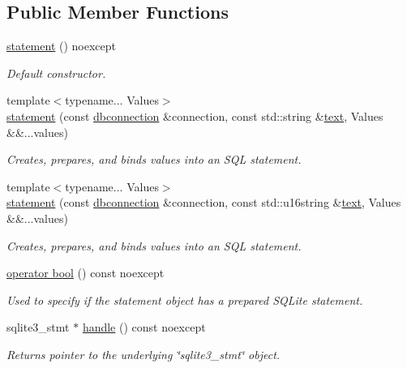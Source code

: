 \subsection*{Public Member Functions}
\begin{DoxyCompactItemize}
\item 
\hyperlink{a00013_a1355244b2e1153eb26daea61e52e153a}{statement} () noexcept
\begin{DoxyCompactList}\small\item\em Default constructor. \end{DoxyCompactList}\item 
{\footnotesize template$<$typename... Values$>$ }\\\hyperlink{a00013_ae92826d1d30ee7ea86a5e8ac6aad8aac}{statement} (const \hyperlink{a00004}{dbconnection} \&connection, const std\-::string \&\hyperlink{a00038_a7467e5cdd32bbf7fce35aced88682dc0a1cb251ec0d568de6a929b520c4aed8d1}{text}, Values \&\&...values)
\begin{DoxyCompactList}\small\item\em Creates, prepares, and binds values into an S\-Q\-L statement. \end{DoxyCompactList}\item 
{\footnotesize template$<$typename... Values$>$ }\\\hyperlink{a00013_a5b4dd3c704336b6373880dce27fe5b71}{statement} (const \hyperlink{a00004}{dbconnection} \&connection, const std\-::u16string \&\hyperlink{a00038_a7467e5cdd32bbf7fce35aced88682dc0a1cb251ec0d568de6a929b520c4aed8d1}{text}, Values \&\&...values)
\begin{DoxyCompactList}\small\item\em Creates, prepares, and binds values into an S\-Q\-L statement. \end{DoxyCompactList}\item 
\hyperlink{a00013_a558b055f3210c6ab7575dc2c23cb7be2}{operator bool} () const noexcept
\begin{DoxyCompactList}\small\item\em Used to specify if the statement object has a prepared S\-Q\-Lite statement. \end{DoxyCompactList}\item 
sqlite3\-\_\-stmt $\ast$ \hyperlink{a00013_aef59d3eb044ce240bd9ca3c8958d4abe}{handle} () const noexcept
\begin{DoxyCompactList}\small\item\em Returns pointer to the underlying \char`\"{}sqlite3\-\_\-stmt\char`\"{} object. \end{DoxyCompactList}\item 

\end{DoxyCompactItemize}
